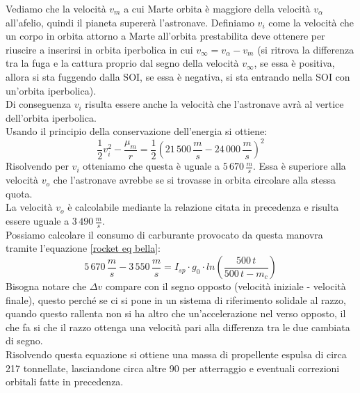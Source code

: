 Vediamo che la velocità $v_m$ a cui Marte orbita è maggiore della velocità $v_\alpha$ all'afelio, quindi il pianeta supererà l'astronave. Definiamo $v_i$ come la velocità che un corpo in orbita attorno a Marte all'orbita prestabilita deve ottenere per riuscire a inserirsi in orbita iperbolica in cui $v_\infty = v_\alpha - v_m$ (si ritrova la differenza tra la fuga e la cattura proprio dal segno della velocità $v_\infty$, se essa è positiva, allora si sta fuggendo dalla SOI, se essa è negativa, si sta entrando nella SOI con un'orbita iperbolica).\\
Di conseguenza $v_i$ risulta essere anche la velocità che l'astronave avrà al vertice dell'orbita iperbolica.\\
Usando il principio della conservazione dell'energia si ottiene:
$$
\frac{1}{2}v_i^2 - \frac{\mu_m}{r} = \frac{1}{2}\left(21\,500\,\frac{m}{s} - 24\,000\,\frac{m}{s}\right)^2
$$
Risolvendo per $v_i$ otteniamo che questa è uguale a $5\,670\,\frac{m}{s}$. Essa è superiore alla velocità $v_o$ che l'astronave avrebbe se si trovasse in orbita circolare alla stessa quota.\\
La velocità $v_o$ è calcolabile mediante la relazione citata in precedenza e risulta essere uguale a $3\,490\,\frac{m}{s}$.\\
Possiamo calcolare il consumo di carburante provocato da questa manovra tramite l'equazione \ref{rocket eq bella}:
$$
5\,670\,\frac{m}{s}-3\,550\,\frac{m}{s} = I_{sp} \cdot g_0 \cdot ln\left(\frac{500\,t}{500\,t - m_c}\right)
$$
Bisogna notare che $\Delta v$ compare con il segno opposto (velocità iniziale - velocità finale), questo perché se ci si pone in un sistema di riferimento solidale al razzo, quando questo rallenta non si ha altro che un'accelerazione nel verso opposto, il che fa si che il razzo ottenga una velocità pari alla differenza tra le due cambiata di segno.\\
Risolvendo questa equazione si ottiene una massa di propellente espulsa di circa 217 tonnellate, lasciandone circa altre 90 per atterraggio e eventuali correzioni orbitali fatte in precedenza.
